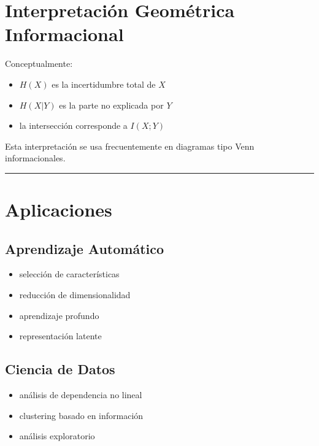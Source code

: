\documentclass[letterpaper,10pt,english]{jupyterBook}
\begin{document}
\section{Interpretación Geométrica Informacional}
\label{\detokenize{01_theory/mutual_information:interpretacion-geometrica-informacional}}
\sphinxAtStartPar
Conceptualmente:
\begin{itemize}
\item {} 
\sphinxAtStartPar
\(H(X)\) es la incertidumbre total de \(X\)

\item {} 
\sphinxAtStartPar
\(H(X|Y)\) es la parte no explicada por \(Y\)

\item {} 
\sphinxAtStartPar
la intersección corresponde a \(I(X;Y)\)

\end{itemize}

\sphinxAtStartPar
Esta interpretación se usa frecuentemente en diagramas tipo Venn
informacionales.


\bigskip\hrule\bigskip



\section{Aplicaciones}
\label{\detokenize{01_theory/mutual_information:aplicaciones}}

\subsection{Aprendizaje Automático}
\label{\detokenize{01_theory/mutual_information:aprendizaje-automatico}}\begin{itemize}
\item {} 
\sphinxAtStartPar
selección de características

\item {} 
\sphinxAtStartPar
reducción de dimensionalidad

\item {} 
\sphinxAtStartPar
aprendizaje profundo

\item {} 
\sphinxAtStartPar
representación latente

\end{itemize}


\subsection{Ciencia de Datos}
\label{\detokenize{01_theory/mutual_information:ciencia-de-datos}}\begin{itemize}
\item {} 
\sphinxAtStartPar
análisis de dependencia no lineal

\item {} 
\sphinxAtStartPar
clustering basado en información

\item {} 
\sphinxAtStartPar
análisis exploratorio

\end{itemize}
\end{document}
